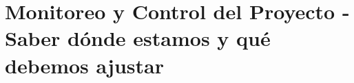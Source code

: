 \clearpage
\section{Monitoreo y Control del Proyecto - Saber dónde estamos y qué debemos ajustar}\label{sec:spmp-10}




